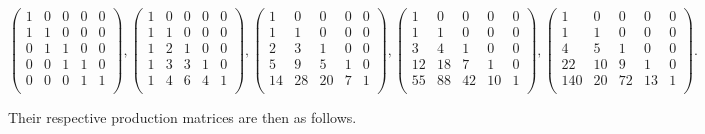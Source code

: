 \documentclass[12pt,reqno]{article}
\theoremstyle{definition}
\begin{document}
\begin{scriptsize}
$$\left(
\begin{array}{ccccc}
1& 0 & 0 & 0 & 0 \\
1 & 1 & 0 & 0 & 0 \\
0 & 1 & 1 & 0 & 0 \\
0 & 0 & 1 & 1 & 0  \\
0 & 0 & 0 & 1 & 1 \\
\end{array}\right),
\left(
\begin{array}{ccccc}
1& 0 & 0 & 0 & 0 \\
1 & 1 & 0 & 0 & 0 \\
1 & 2 & 1 & 0 & 0 \\
1 & 3 & 3 & 1 & 0  \\
1 & 4 & 6 & 4 & 1 \\
\end{array}\right),
\left(
\begin{array}{ccccc}
1& 0 & 0 & 0 & 0 \\
1 & 1 & 0 & 0 & 0 \\
2 & 3 & 1 & 0 & 0 \\
5 & 9 & 5 & 1 & 0  \\
14 & 28 & 20 & 7 & 1 \\
\end{array}\right),
\left(
\begin{array}{ccccc}
1& 0 & 0 & 0 & 0 \\
1 & 1 & 0 & 0 & 0 \\
3 & 4 & 1 & 0 & 0 \\
12 & 18 & 7 & 1 & 0  \\
55 & 88 & 42 & 10 & 1 \\
\end{array}\right),
\left(
\begin{array}{ccccc}
1& 0 & 0 & 0 & 0 \\
1 & 1 & 0 & 0 & 0 \\
4 & 5 & 1 & 0 & 0 \\
22 & 10 & 9 & 1 & 0  \\
140 & 20 & 72 & 13 & 1 \\
\end{array}\right).$$
\end{scriptsize}
Their respective production matrices are then as follows.
\end{document}

